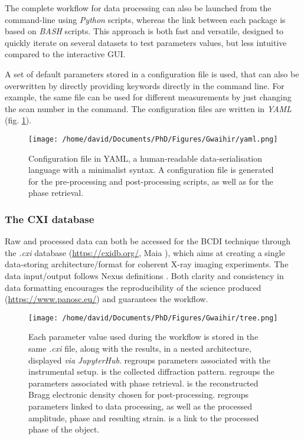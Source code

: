 The complete workflow for data processing can also be launched from the command-line using \textit{Python} scripts, whereas the link between each package is based on \textit{BASH} scripts.
This approach is both fast and versatile, designed to quickly iterate on several datasets to test parameters values, but less intuitive compared to the interactive GUI.

A set of default parameters stored in a configuration file is used, that can also be overwritten by directly providing keywords directly in the command line.
For example, the same file can be used for different measurements by just changing the scan number in the command.
The configuration files are written in \textit{YAML} (fig. \ref{fig:YAML_file}).

\begin{figure}[!htb]
    \centering
    \texttt{[image: /home/david/Documents/PhD/Figures/Gwaihir/yaml.png]}
    \caption{
    Configuration file in YAML, a human-readable data-serialisation language with a minimalist syntax.
    A configuration file is generated for the pre-processing and post-processing scripts, as well as for the phase retrieval.
    }
    \label{fig:YAML_file}
\end{figure}

\subsubsection{The CXI database}

Raw and processed data can both be accessed for the BCDI technique through the \textit{.cxi} database (\url{https://cxidb.org/}, Maia \cite*{Maia2012}), which aims at creating a single data-storing architecture/format for coherent X-ray imaging experiments.
The data input/output follows Nexus definitions \parencite{Konnecke2015}.
Both clarity and consistency in data formatting encourages the reproducibility of the science produced (\url{https://www.panosc.eu/}) and guarantees the workflow.

\begin{figure}[!htb]
    \centering
    \texttt{[image: /home/david/Documents/PhD/Figures/Gwaihir/tree.png]}
    \caption{
    Each parameter value used during the workflow is stored in the same \textit{.cxi} file, along with the results, in a nested architecture, displayed \textit{via} \textit{JupyterHub}.
     regroups parameters associated with the instrumental setup.
     is the collected diffraction pattern.
     regroups the parameters associated with phase retrieval.
     is the reconstructed Bragg electronic density chosen for post-processing.
     regroups parameters linked to data processing, as well as the processed amplitude, phase and resulting strain.
     is a link to the processed phase of the object.
    }
    \label{fig:TREE}
\end{figure}

